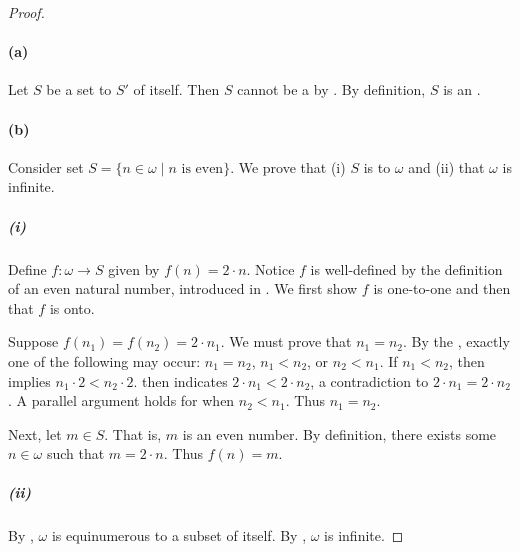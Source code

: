 \documentclass{report}
\begin{document}
  \begin{proof}

    \paragraph{(a)}%

      Let $S$ be a set  to 
        $S'$ of itself.
      Then $S$ cannot be a  by
        .
      By definition, $S$ is an .

    \paragraph{(b)}%

      Consider set $S = \{n \in \omega \mid n \text{ is even}\}$.
      We prove that (i) $S$ is  to $\omega$ and (ii)
        that $\omega$ is infinite.

      \subparagraph{(i)}%

        Define $f \colon \omega \rightarrow S$ given by $f(n) = 2 \cdot n$.
        Notice $f$ is well-defined by the definition of an even natural number,
          introduced in .
        We first show $f$ is one-to-one and then that $f$ is onto.

        Suppose $f(n_1) = f(n_2) = 2 \cdot n_1$.
        We must prove that $n_1 = n_2$.
        By the , exactly one of the
          following may occur: $n_1 = n_2$, $n_1 < n_2$, or $n_2 < n_1$.
        If $n_1 < n_2$, then  implies
          $n_1 \cdot 2 < n_2 \cdot 2$.
         then indicates $2 \cdot n_1 < 2 \cdot n_2$,
          a contradiction to $2 \cdot n_1 = 2 \cdot n_2$.
        A parallel argument holds for when $n_2 < n_1$.
        Thus $n_1 = n_2$.

        Next, let $m \in S$.
        That is, $m$ is an even number.
        By definition, there exists some $n \in \omega$ such that
          $m = 2 \cdot n$.
        Thus $f(n) = m$.

      \subparagraph{(ii)}%

        By , $\omega$ is equinumerous to a subset
          of itself.
        By , $\omega$ is infinite.

  \end{proof}
\end{document}
